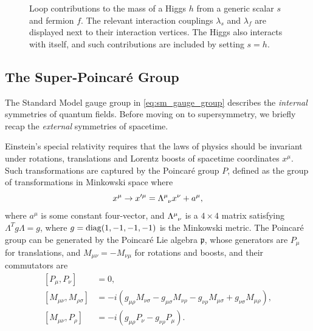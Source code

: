\begin{figure}
    \centering
    \begin{subfigure}[b]{0.4\linewidth}
        \centering
        \caption{}
        \label{fig:hierarchy_scalar}
    \end{subfigure}
    \begin{subfigure}[b]{0.4\linewidth}
        \centering
        \caption{}
        \label{fig:hierarchy_fermion}
    \end{subfigure}
    \caption{Loop contributions to the mass of a Higgs $h$ from a generic scalar $s$ and fermion $f$. The relevant interaction couplings $\lambda_s$ and $\lambda_f$ are displayed next to their interaction vertices. The Higgs also interacts with itself, and such contributions are included by setting $s=h$.}
    \label{fig:hierarchy_problem}
\end{figure}


\subsection{The Super-Poincar\'e Group}\label{sec:super_poincare}

The Standard Model gauge group in \cref{eq:sm_gauge_group} describes the \emph{internal} symmetries of quantum fields. Before moving on to supersymmetry, we briefly recap the \emph{external} symmetries of spacetime.

Einstein's special relativity requires that the laws of physics should be invariant under rotations, translations and Lorentz boosts of spacetime coordinates $x^\mu$.
Such transformations are captured by the Poincar\'e group $P$, defined as the group of transformations in Minkowski space where
\begin{equation}
    x^\mu \to x'^\mu = \Lambda\indices{^\mu_\nu} x^\nu + a^\mu,
\end{equation}
where $a^\mu$ is some constant four-vector, and $\Lambda\indices{^\mu_\nu}$ is a $4\times4$ matrix satisfying $\Lambda^T g \Lambda = g$, where $g=\operatorname{diag}(1,-1,-1,-1)$ is the Minkowski metric.
The Poincar\'e group can be generated by the Poincar\'e Lie algebra $\mathfrak{p}$, whose generators are $P_\mu$ for translations, and $M_{\mu\nu}=-M_{\nu\mu}$ for rotations and boosts, and their commutators are
\begin{subequations}
\label{eq:poincare_algebra}
\begin{align}
    [P_\mu,P_\nu] &= 0,
    \\
    [M_{\mu\nu},M_{\rho\sigma}] &= -i(g_{\mu\rho} M_{\nu\sigma} - g_{\mu\sigma} M_{\nu\rho} - g_{\nu\rho} M_{\mu\sigma} + g_{\nu\sigma } M_{\mu\rho}),
    \\
    [M_{\mu\nu}, P_\rho] &= -i(g_{\mu\rho}P_\nu - g_{\nu\rho}P_\mu).
\end{align}
\end{subequations}

